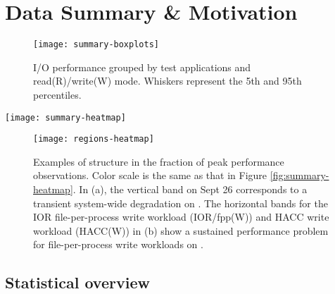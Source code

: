 \section{Data Summary \& Motivation}  \label{sec:features}

\begin{figure}
    \centering
    \texttt{[image: summary-boxplots]}
    \vspace{-.15in}
    \caption{I/O performance grouped by test applications and read(R)/write(W) mode.  Whiskers represent the 5th and 95th percentiles.}
    \label{fig:summary-boxplots}
\end{figure}

\begin{figure*}
    \centering
    \texttt{[image: summary-heatmap]}
    \vspace{-.2in}
    \caption{Performance of daily benchmarks normalized to each benchmark's peak observed performance on the specified storage system.  The y-axis labels show combinations of system, I/O motif, and mode (Read/Write).  Grey represents days on which no observations were made.  The two regions highlighted in green boxes are expanded upon in Figure \ref{fig:regions-heatmap}.}
    \label{fig:summary-heatmap}
\end{figure*}

\begin{figure}
    \centering
    \texttt{[image: regions-heatmap]}
    \vspace{-.2in}
    \caption{Examples of structure in the fraction of peak performance observations.  Color scale is the same as that in Figure \ref{fig:summary-heatmap}.  In (a), the vertical band on Sept 26 corresponds to a transient system-wide degradation on \mira.  The horizontal bands for the IOR file-per-process write workload (IOR/fpp(W)) and HACC write workload (HACC(W)) in (b) show a sustained performance problem for file-per-process write workloads on \cori.}
    \label{fig:regions-heatmap}
\end{figure}




\subsection{Statistical overview} \label{sec:features/summary}



